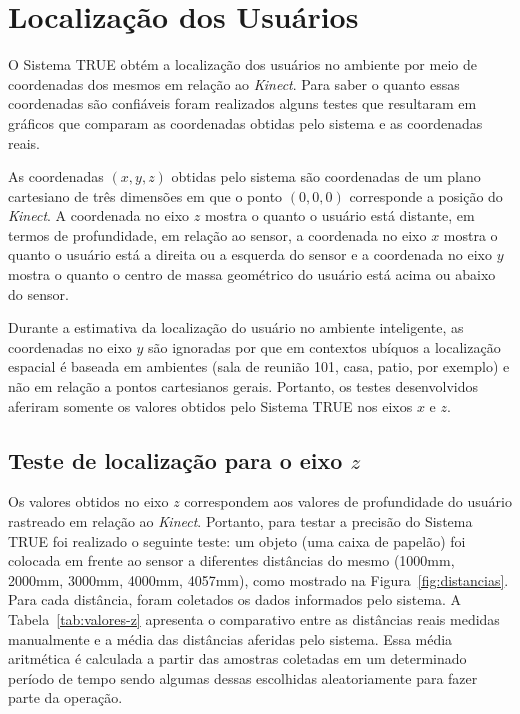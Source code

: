\section{Localização dos Usuários}

O Sistema TRUE obtém a localização dos usuários no ambiente por meio de
coordenadas dos mesmos em relação ao \textit{Kinect}. Para saber o quanto essas
coordenadas são confiáveis foram realizados alguns testes que resultaram em
gráficos que comparam as coordenadas obtidas pelo sistema e as coordenadas
reais.

As coordenadas $\displaystyle (x, y, z)$ obtidas pelo sistema são coordenadas de
um plano cartesiano de três dimensões em que o ponto $\displaystyle (0, 0, 0)$
corresponde a posição do \textit{Kinect}. A coordenada no eixo  $\displaystyle
z$ mostra o quanto o usuário está distante, em termos de profundidade, em
relação ao sensor, a coordenada no eixo  $\displaystyle x$ mostra o quanto o
usuário está a direita ou a esquerda do sensor e a coordenada no eixo 
$\displaystyle y$ mostra o quanto o centro de massa geométrico do usuário está
acima ou abaixo do sensor.

Durante a estimativa da localização do usuário no ambiente inteligente, as
coordenadas no eixo  $\displaystyle y$ são ignoradas por que em contextos
ubíquos a localização espacial é baseada em ambientes (sala de
reunião 101, casa, patio, por exemplo) e não em relação a pontos cartesianos
gerais. Portanto, os testes desenvolvidos aferiram somente os valores obtidos
pelo Sistema TRUE nos eixos $\displaystyle x$ e $\displaystyle z$.



\subsection{Teste de localização para o eixo $\displaystyle z$}

	Os valores obtidos no eixo $\displaystyle z$ correspondem aos valores de
	profundidade do usuário rastreado em relação ao \textit{Kinect}. Portanto, para
	testar a precisão do Sistema TRUE foi realizado o seguinte teste: um objeto (uma
	caixa de papelão) foi colocada em frente ao sensor a diferentes distâncias do
	mesmo (1000mm, 2000mm, 3000mm, 4000mm, 4057mm), como mostrado
	na Figura~\ref{fig:distancias}. Para cada distância, foram coletados os dados
	informados pelo sistema. A Tabela~\ref{tab:valores-z} apresenta o comparativo
	entre as distâncias reais medidas manualmente e a média das distâncias
	aferidas pelo sistema. Essa média aritmética é calculada a partir das amostras
	coletadas em um determinado período de tempo sendo algumas dessas escolhidas
	aleatoriamente para fazer parte da operação.

